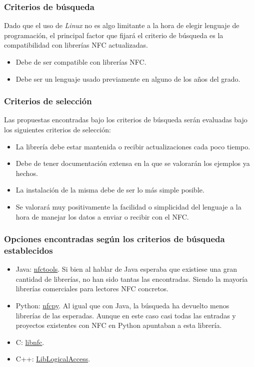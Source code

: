 \subsubsection{Criterios de búsqueda}

Dado que el uso de \emph{Linux} no es algo limitante a la hora de elegir lenguaje de
programación, el principal factor que fijará el criterio de búsqueda es la
compatibilidad con librerías NFC actualizadas.

\begin{itemize}
    \item Debe de ser compatible con librerías NFC.
    \item Debe ser un lenguaje usado previamente en alguno de los años del grado.
\end{itemize}

\subsubsection{Criterios de selección}

Las propuestas encontradas bajo los criterios de búsqueda serán evaluadas bajo
los siguientes criterios de selección:

\begin{itemize}
    \item La librería debe estar mantenida o recibir actualizaciones cada poco tiempo.
    \item Debe de tener documentación extensa en la que se valorarán los ejemplos ya hechos.
    \item La instalación de la misma debe de ser lo más simple posible.
    \item Se valorará muy positivamente la facilidad o simplicidad del lenguaje a la hora de manejar los datos a enviar o recibir con el NFC.
\end{itemize}

\subsubsection{Opciones encontradas según los criterios de búsqueda establecidos}

\begin{itemize}
    \item Java: \href{https://github.com/grundid/nfctools}{nfctools}. Si bien al
    hablar de Java esperaba que existiese una gran cantidad de librerías, no han
    sido tantas las encontradas. Siendo la mayoría librerías comerciales para
    lectores NFC concretos.
    \item Python: \href{https://github.com/nfcpy/nfcpy}{nfcpy}. Al igual que con
    Java, la búsqueda ha devuelto menos librerías de las esperadas. Aunque en
    este caso casi todas las entradas y proyectos existentes con NFC en Python
    apuntaban a esta librería.
    \item C: \href{https://github.com/nfc-tools/libnfc}{libnfc}. 
    \item C++: \href{https://github.com/liblogicalaccess/liblogicalaccess}{LibLogicalAccess}.
\end{itemize}

